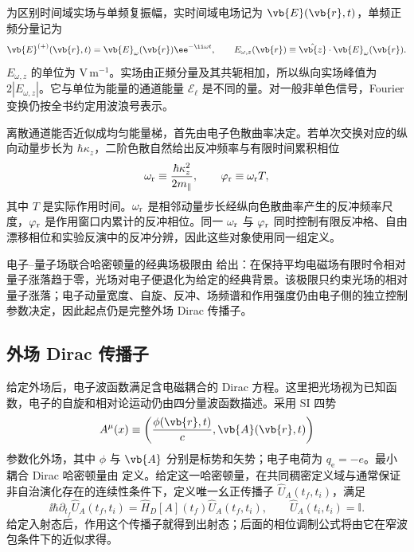 为区别时间域实场与单频复振幅，实时间域电场记为 $\vb{E}(\vb{r},t)$，单频正频分量记为
\begin{equation*}
 \vb{E}^{(+)}(\vb{r},t)=\vb{E}_\omega(\vb{r})\ee^{-\ii\omega t},
 \qquad
 E_{\omega,z}(\vb{r})\equiv\hat{\vb{z}}\cdot\vb{E}_\omega(\vb{r}).
\end{equation*}
$E_{\omega,z}$ 的单位为 $\mathrm{V\,m^{-1}}$。实场由正频分量及其共轭相加，所以纵向实场峰值为 $2|E_{\omega,z}|$。它与单位为能量的通道能量 $\mathcal E_\ell$ 是不同的量。对一般非单色信号，Fourier 变换仍按全书约定用波浪号表示。

离散通道能否近似成均匀能量梯，首先由电子色散曲率决定。若单次交换对应的纵向动量步长为 $\hbar \kappa_z$，二阶色散自然给出反冲频率与有限时间累积相位
\begin{equation}
{
\omega_{\rm r}\equiv\frac{\hbar \kappa_z^2}{2m_\parallel},\qquad
\varphi_{\rm r}\equiv\omega_{\rm r}T,}
\label{eq:pinem_recoil_frequency_master}
\end{equation}
其中 $T$ 是实际作用时间。$\omega_{\rm r}$ 是相邻动量步长经纵向色散曲率产生的反冲频率尺度，$\varphi_{\rm r}$ 是作用窗口内累计的反冲相位。同一 $\omega_{\rm r}$ 与 $\varphi_{\rm r}$ 同时控制有限反冲格、自由漂移相位和实验反演中的反冲分辨，因此这些对象使用同一组定义。

电子--量子场联合哈密顿量的经典场极限由 给出：在保持平均电磁场有限时令相对量子涨落趋于零，光场对电子便退化为给定的经典背景。该极限只约束光场的相对量子涨落；电子动量宽度、自旋、反冲、场频谱和作用强度仍由电子侧的独立控制参数决定，因此起点仍是完整外场 Dirac 传播子。

\subsection{外场 Dirac 传播子}

给定外场后，电子波函数满足含电磁耦合的 Dirac 方程。这里把光场视为已知函数，电子的自旋和相对论运动仍由四分量波函数描述。采用 SI 四势
\begin{equation*}
A^\mu(x)\equiv\left(\frac{\phi(\vb{r},t)}{c},\vb{A}(\vb{r},t)\right)
\end{equation*}
参数化外场，其中 $\phi$ 与 $\vb{A}$ 分别是标势和矢势；电子电荷为 $q_{\mathrm e}=-e$。最小耦合 Dirac 哈密顿量由 定义。给定这一哈密顿量，在共同稠密定义域与通常保证非自治演化存在的连续性条件下，定义唯一幺正传播子 $\hat U_A(t_f,t_i)$，满足
\begin{equation}
{
\ii\hbar\partial_{t_f}\hat U_A(t_f,t_i)
=\hat H_D[A](t_f)\hat U_A(t_f,t_i),
\qquad
\hat U_A(t_i,t_i)=\mathbb I.}
\label{eq:exact_external_field_evolution}
\end{equation}
给定入射态后，作用这个传播子就得到出射态；后面的相位调制公式将由它在窄波包条件下的近似求得。

